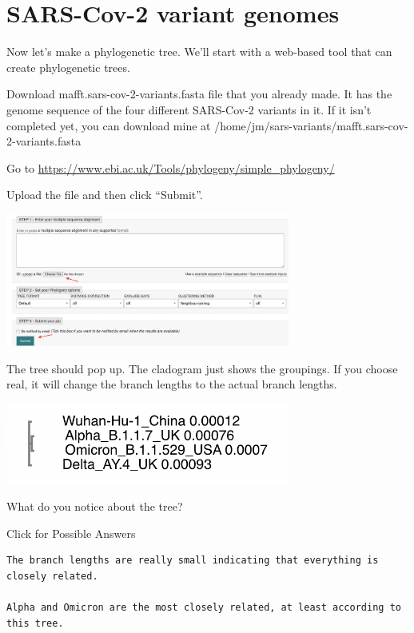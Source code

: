 \documentclass[
]{book}
\begin{document}
\hypertarget{sars-cov-2-variant-genomes-1}{%
\section{SARS-Cov-2 variant genomes}\label{sars-cov-2-variant-genomes-1}}

Now let's make a phylogenetic tree. We'll start with a web-based tool that can create phylogenetic trees.

Download mafft.sars-cov-2-variants.fasta file that you already made. It has the genome sequence of the four different SARS-Cov-2 variants in it. If it isn't completed yet, you can download mine at /home/jm/sars-variants/mafft.sars-cov-2-variants.fasta

Go to \url{https://www.ebi.ac.uk/Tools/phylogeny/simple_phylogeny/}

Upload the file and then click ``Submit''.

\includegraphics[width=0.7\textwidth,height=\textheight]{./Figures/SimplePhylogeny.png}

The tree should pop up. The cladogram just shows the groupings. If you choose real, it will change the branch lengths to the actual branch lengths.

\includegraphics[width=0.7\textwidth,height=\textheight]{./Figures/real.png}

What do you notice about the tree?

Click for Possible Answers

\begin{verbatim}
The branch lengths are really small indicating that everything is closely related.

Alpha and Omicron are the most closely related, at least according to this tree.
\end{verbatim}
\end{document}
